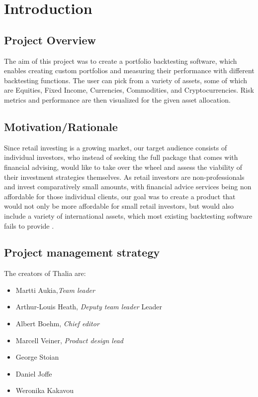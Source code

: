 \documentclass[main.tex]{subfiles}
\begin{document}
\section{Introduction}
\subsection {Project Overview}

The aim of this project was to create a portfolio backtesting software, which enables creating custom portfolios and measuring their performance with different backtesting functions. The user can pick from a variety of assets, some of which are Equities, Fixed Income, Currencies, Commodities, and Cryptocurrencies. Risk metrics and performance are then visualized for the given asset allocation.
\subsection{Motivation/Rationale}
Since retail investing is a growing market, our target audience consists of individual investors, who instead of seeking the full package that comes with financial advising, would like to take over the wheel and assess the viability of their investment strategies themselves. As retail investors are non-professionals and invest comparatively small amounts, with financial advice services being non affordable for those individual clients, our goal was to create a product that would not only be more affordable for small retail investors, but would also include a variety of international assets, which most existing backtesting software fails to provide \cite{WP_IBC}.

\subsection{Project management strategy}

The creators of Thalia are:
\begin{itemize}
    \item Martti Aukia,\textit{Team leader}
    \item Arthur-Louis Heath, \textit{Deputy team leader} Leader
	\item Albert Boehm, \textit{Chief editor}
	\item Marcell Veiner, \textit{Product design lead}
	\item George Stoian 
	\item Daniel Joffe
	\item Weronika Kakavou
\end{itemize}
\end{document}
